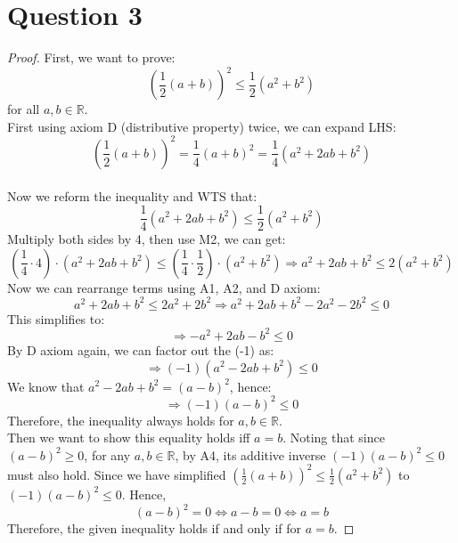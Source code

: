 \documentclass{article}
\begin{document}
\section*{Question 3}
\begin{proof}
    First, we want to prove:
    \[ \left( \frac{1}{2} (a + b) \right)^2 \leq \frac{1}{2} (a^2 + b^2) \]
    for all $a,b \in \mathbb{R}$.
    \\
    First using axiom D (distributive property) twice, we can expand LHS:
    \[ \left( \frac{1}{2} (a + b) \right)^2 = \frac{1}{4}(a + b)^2 = \frac{1}{4}(a^2 + 2ab + b^2) \]
    \\
    Now we reform the inequality and WTS that:
    \[ \frac{1}{4}(a^2 + 2ab + b^2) \leq \frac{1}{2} (a^2 + b^2) \]
    Multiply both sides by 4, then use M2, we can get:
    \[ (\frac{1}{4} \cdot 4) \cdot (a^2 + 2ab + b^2) \leq (\frac{1}{4} \cdot \frac{1}{2}) \cdot (a^2 + b^2) \Rightarrow a^2 + 2ab + b^2 \leq 2(a^2 + b^2) \]
    Now we can rearrange terms using A1, A2, and D axiom:
    \[ a^2 + 2ab + b^2 \leq 2a^2 + 2b^2 \Rightarrow a^2 + 2ab + b^2 - 2a^2 - 2b^2 \leq 0 \]
    This simplifies to:
    \[ \Rightarrow -a^2 + 2ab - b^2 \leq 0 \]
    By D axiom again, we can factor out the (-1) as:
    \[ \Rightarrow (-1)(a^2 - 2ab + b^2) \leq 0 \]
    We know that \( a^2 - 2ab + b^2 = (a - b)^2 \), hence:
    \[ \Rightarrow (-1)(a - b)^2 \leq 0 \]
    Therefore, the inequality always holds for $a, b \in \mathbb{R}$.
    \\
    Then we want to show this equality holds iff $a = b$.
    Noting that since $(a - b)^2 \geq 0$, for any $a,b \in \mathbb{R}$, by A4, its additive inverse $(-1)(a - b)^2 \leq 0$ must also hold. Since we have simplified \(\left( \frac{1}{2} (a + b) \right)^2 \leq \frac{1}{2} (a^2 + b^2) \) to \( (-1)(a - b)^2 \leq 0 \). Hence,
    \[ (a - b)^2 = 0 \Leftrightarrow a - b = 0 \Leftrightarrow  a = b \]
    Therefore, the given inequality holds if and only if for $a = b$.
\end{proof}
\end{document}
